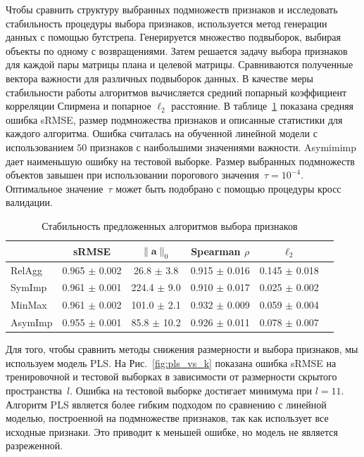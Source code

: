 \documentclass[preprint,12pt]{elsarticle}
\theoremstyle{definition}
\newcommand{\ba}{\mathbf{a}}
\begin{document}
Чтобы сравнить структуру выбранных подмножеств признаков и исследовать стабильность процедуры выбора признаков, используется метод генерации данных с помощью бутстрепа. 
Генерируется множество подвыборок, выбирая объекты по одному с возвращениями. 
Затем решается задачу выбора признаков для каждой пары матрицы плана и целевой матрицы.
Сравниваются полученные вектора важности для различных подвыборок данных. 
В качестве меры стабильности работы алгоритмов вычисляется средний попарный коэффициент корреляции Спирмена и попарное $\ell_2$ расстояние.
В таблице~\ref{tbl:stability} показана средняя ошибка sRMSE, размер подмножества признаков и описанные статистики для каждого алгоритма. 
Ошибка считалась на обученной линейной модели с использованием $50$ признаков с наибольшими значениями важности.
Asymimimp дает наименьшую ошибку на тестовой выборке. 
Размер выбранных подмножеств объектов завышен при использовании порогового значения~$\tau=10^{-4}$. 
Оптимальное значение~$\tau$ может быть подобрано с помощью процедуры кросс валидации.

\begin{table}[]
	\caption{Стабильность предложенных алгоритмов выбора признаков}
	\centering
	\begin{tabular}{l|ccccc}
		\hline
		& sRMSE  & $\|\ba\|_0$ & Spearman $\rho$ & $\ell_2$ \\ \hline
		RelAgg & 0.965 $\pm$ 0.002 & 26.8 $\pm$ 3.8 & 0.915 $\pm$ 0.016 & 0.145 $\pm$ 0.018   \\
		SymImp & 0.961 $\pm$ 0.001 & 224.4 $\pm$ 9.0 & 0.910 $\pm$ 0.017 & 0.025 $\pm$ 0.002   \\
		MinMax & 0.961 $\pm$ 0.002 & 101.0 $\pm$ 2.1& 0.932 $\pm$ 0.009 & 0.059 $\pm$ 0.004   \\
		AsymImp & 0.955 $\pm$ 0.001 & 85.8 $\pm$ 10.2& 0.926 $\pm$ 0.011 & 0.078 $\pm$ 0.007  \\ \hline
	\end{tabular}
	\label{tbl:stability}
\end{table}

Для того, чтобы сравнить методы снижения размерности и выбора признаков, мы используем модель PLS. 
На Рис.~\ref{fig:pls_vs_k} показана ошибка sRMSE на тренировочной и тестовой выборках в зависимости от размерности скрытого пространства~$l$.
Ошибка на тестовой выборке достигает минимума при $l = 11$.
Алгоритм PLS является более гибким подходом по сравнению с линейной моделью, построенной на подмножестве признаков, так как использует все исходные признаки.
Это приводит к меньшей ошибке, но модель не является разреженной.
\end{document}
